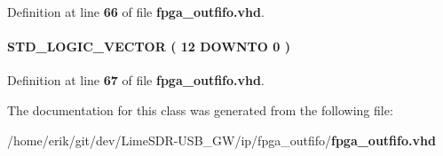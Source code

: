 Definition at line {\bf 66} of file {\bf fpga\+\_\+outfifo.\+vhd}.

\paragraph[{sub\+\_\+wire4}]{ {\bfseries \textcolor{comment}{S\+T\+D\+\_\+\+L\+O\+G\+I\+C\+\_\+\+V\+E\+C\+T\+OR}\textcolor{vhdlchar}{ }\textcolor{vhdlchar}{(}\textcolor{vhdlchar}{ }\textcolor{vhdlchar}{ } \textcolor{vhdldigit}{12} \textcolor{vhdlchar}{ }\textcolor{keywordflow}{D\+O\+W\+N\+TO}\textcolor{vhdlchar}{ }\textcolor{vhdlchar}{ } \textcolor{vhdldigit}{0} \textcolor{vhdlchar}{ }\textcolor{vhdlchar}{)}\textcolor{vhdlchar}{ }} \hspace{0.3cm}{\ttfamily [Signal]}}\label{classfpga__outfifo_1_1SYN_a98e6b671c3a0d8bf71d968818d8a2084}


Definition at line {\bf 67} of file {\bf fpga\+\_\+outfifo.\+vhd}.



The documentation for this class was generated from the following file\+:\begin{DoxyCompactItemize}
\item 
/home/erik/git/dev/\+Lime\+S\+D\+R-\/\+U\+S\+B\+\_\+\+G\+W/ip/fpga\+\_\+outfifo/{\bf fpga\+\_\+outfifo.\+vhd}\end{DoxyCompactItemize}
